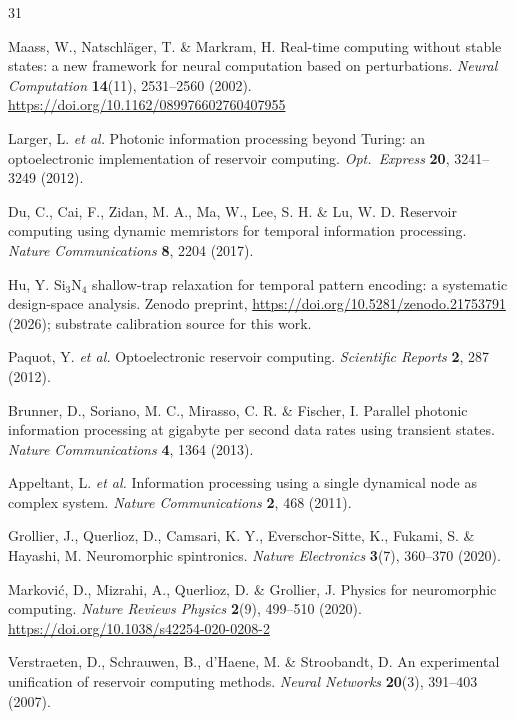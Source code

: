 \documentclass[11pt]{article}
\begin{document}
\begin{thebibliography}{31}

 Maass, W., Natschläger, T. \& Markram, H. Real-time
computing without stable states: a new framework for neural computation based
on perturbations. \emph{Neural Computation} \textbf{14}(11), 2531--2560 (2002).
\url{https://doi.org/10.1162/089976602760407955}

 Larger, L. \emph{et al.} Photonic information processing
beyond Turing: an optoelectronic implementation of reservoir computing.
\emph{Opt.~Express} \textbf{20}, 3241--3249 (2012).

 Du, C., Cai, F., Zidan, M. A., Ma, W., Lee, S. H. \& Lu, W. D.
Reservoir computing using dynamic memristors for temporal information
processing. \emph{Nature Communications} \textbf{8}, 2204 (2017).

 Hu, Y. Si$_3$N$_4$ shallow-trap relaxation for temporal
pattern encoding: a systematic design-space analysis. Zenodo preprint,
\url{https://doi.org/10.5281/zenodo.21753791} (2026); substrate
calibration source for this work.

 Paquot, Y. \emph{et al.} Optoelectronic reservoir
computing. \emph{Scientific Reports} \textbf{2}, 287 (2012).

 Brunner, D., Soriano, M. C., Mirasso, C. R. \& Fischer,
I. Parallel photonic information processing at gigabyte per second data rates
using transient states. \emph{Nature Communications} \textbf{4}, 1364 (2013).

 Appeltant, L. \emph{et al.} Information processing
using a single dynamical node as complex system. \emph{Nature Communications}
\textbf{2}, 468 (2011).

 Grollier, J., Querlioz, D., Camsari, K. Y.,
Everschor-Sitte, K., Fukami, S. \& Hayashi, M. Neuromorphic spintronics.
\emph{Nature Electronics} \textbf{3}(7), 360--370 (2020).

 Markovi\'c, D., Mizrahi, A., Querlioz, D. \& Grollier,
J. Physics for neuromorphic computing. \emph{Nature Reviews Physics}
\textbf{2}(9), 499--510 (2020). \url{https://doi.org/10.1038/s42254-020-0208-2}

 Verstraeten, D., Schrauwen, B., d'Haene, M. \&
Stroobandt, D. An experimental unification of reservoir computing methods.
\emph{Neural Networks} \textbf{20}(3), 391--403 (2007).


\end{thebibliography}
\end{document}
